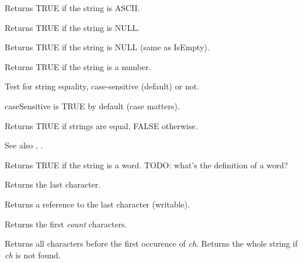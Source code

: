 {

Returns TRUE if the string is ASCII.

\label{wxstringisempty}


Returns TRUE if the string is NULL.

\label{wxstringisnull}


Returns TRUE if the string is NULL (same as IsEmpty).

\label{wxstringisnumber}


Returns TRUE if the string is a number.

\label{wxstringissameas}


Test for string equality, case-sensitive (default) or not.

caseSensitive is TRUE by default (case matters).

Returns TRUE if strings are equal, FALSE otherwise.

See also , .

\label{wxstringisword}


Returns TRUE if the string is a word. TODO: what's the definition of a word?

\label{wxstringlast}


Returns the last character.


Returns a reference to the last character (writable).

\label{wxstringleft}


Returns the first {\it count} characters.


Returns all characters before the first occurence of {\it ch}.
Returns the whole string if {\it ch} is not found.

}
